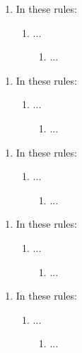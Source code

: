 \begin{enumerate}
    \item In these rules:
    \begin{enumerate}
        \item ...
        \begin{enumerate}
            \item ...
        \end{enumerate}
    \end{enumerate}    
\end{enumerate}

\begin{enumerate}
    \item In these rules:
    \begin{enumerate}
        \item ...
        \begin{enumerate}
            \item ...
        \end{enumerate}
    \end{enumerate}    
\end{enumerate}

\begin{enumerate}
    \item In these rules:
    \begin{enumerate}
        \item ...
        \begin{enumerate}
            \item ...
        \end{enumerate}
    \end{enumerate}    
\end{enumerate}

\begin{enumerate}
    \item In these rules:
    \begin{enumerate}
        \item ...
        \begin{enumerate}
            \item ...
        \end{enumerate}
    \end{enumerate}    
\end{enumerate}

\begin{enumerate}
    \item In these rules:
    \begin{enumerate}
        \item ...
        \begin{enumerate}
            \item ...
        \end{enumerate}
    \end{enumerate}    
\end{enumerate}

